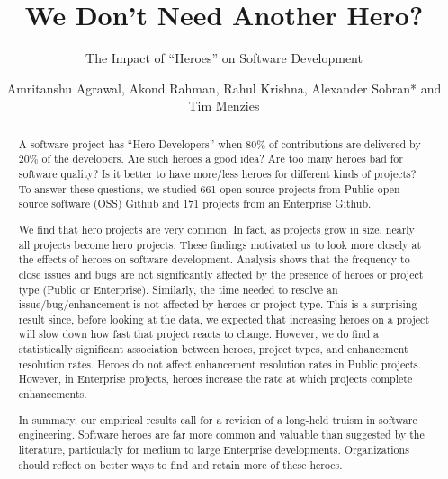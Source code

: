 \documentclass[sigconf]{acmart}
\theoremstyle{break}
\begin{document}



\title{We Don't Need Another Hero?}
\subtitle{The Impact of ``Heroes''  
on  Software Development }

\author{Amritanshu Agrawal, Akond Rahman, Rahul Krishna, Alexander Sobran* and Tim Menzies}


\begin{abstract}
A  software project has 
  ``Hero  Developers'' when  80\% of contributions are delivered by 20\% of the developers. Are such heroes a good idea? Are too many heroes bad for  software quality?  Is it better to have more/less heroes
for different kinds of projects?
To answer these questions, we studied 661 open source  projects from Public open source software (OSS) Github and 171  projects from an Enterprise Github.

We find that hero projects
are very common. In fact, as projects grow in size, nearly
all projects become hero projects. These   findings  motivated us to look more closely at the
effects of heroes on software development.
Analysis shows that the frequency to close issues and bugs are not significantly
affected by the presence of heroes or project type (Public or Enterprise). Similarly, 
the time needed to resolve an issue/bug/enhancement is not affected by heroes or project type. This is a surprising result since, before looking at the data, we expected that increasing
heroes on a project will slow down how fast that project reacts to change. 
However, we do find a statistically significant association between heroes,  project types, and enhancement resolution rates. Heroes do not affect enhancement resolution rates in  Public projects. However, in Enterprise projects,
heroes increase the rate at which projects complete enhancements.

In summary, our empirical results call for a revision of a long-held truism in software engineering.
Software heroes are far more common and valuable than suggested by the literature,
particularly for medium to large  Enterprise developments. Organizations should reflect on better ways
to find and retain more of these heroes.

\end{abstract}
\end{document}
